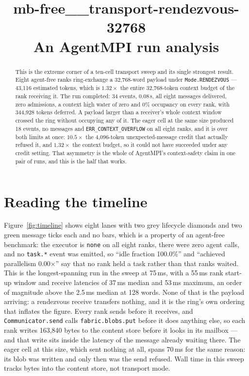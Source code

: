 \documentclass[11pt]{article}
\title{\textbf{mb-free\_\_transport-rendezvous-32768}\\[2pt]\large An AgentMPI run analysis}
\author{}
\date{}
\begin{document}
\maketitle

\begin{abstract}
This is the extreme corner of a ten-cell transport sweep and its single strongest
result. Eight agent-free ranks ring-exchange a 32{,}768-word payload under
\texttt{Mode.RENDEZVOUS} --- 43{,}116 estimated tokens, which is $1.32\times$ the
entire 32{,}768-token context budget of the rank receiving it. The run completed: 34
events, 0.08\,s, all eight messages delivered, zero admissions, a context high water
of zero and 0\% occupancy on every rank, with 344{,}928 tokens deferred. A payload
larger than a receiver's whole context window crossed the ring without occupying any
of it. The eager cell at the same size produced 18 events, no messages and
\texttt{ERR\_CONTEXT\_OVERFLOW} on all eight ranks, and it is over both limits at
once: $10.5\times$ the 4{,}096-token unexpected-message credit that actually refused
it, and $1.32\times$ the context budget, so it could not have succeeded under any
credit setting. That asymmetry is the whole of AgentMPI's context-safety claim in one
pair of runs, and this is the half that works.
\end{abstract}



\section{Reading the timeline}

Figure~\ref{fig:timeline} shows eight lanes with two grey lifecycle diamonds and two
green message ticks each and no bars, which is a property of an agent-free benchmark:
the executor is \texttt{none} on all eight ranks, there were zero agent calls, and no
\texttt{task.*} event was emitted, so ``idle fraction 100.0\%'' and ``achieved
parallelism 0.00$\times$'' say that no rank held a task rather than that ranks
waited. This is the longest-spanning run in the sweep at 75\,ms, with a 55\,ms rank
start-up window and receive latencies of 37\,ms median and 53\,ms maximum, an order
of magnitude above the 2.5\,ms median at 128 words. None of that is the payload
arriving: a rendezvous receive transfers nothing, and it is the ring's own ordering
that inflates the figure. Every rank sends before it receives, and
\texttt{Communicator.send} calls \texttt{fabric.blobs.put} before it does anything
else, so each rank writes 163{,}840 bytes to the content store before it looks in its
mailbox --- and that write sits inside the latency of the message already waiting
there. The eager cell at this size, which sent nothing at all, spans 70\,ms for the
same reason: its blob was written and only then was the send refused. Wall time in
this sweep tracks bytes into the content store, not transport mode.
\end{document}
